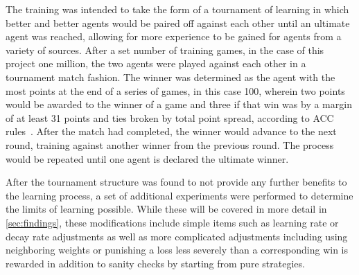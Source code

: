 The training was intended to take the form of a tournament of learning in which
better and better agents would be paired off against each other until an
ultimate agent was reached,
allowing for more experience to be gained for agents from a variety of sources.
%
After a set number of training games,
in the case of this project one million,
the two agents were played against each other in a tournament match fashion.
%
The winner was determined as the agent with the most points at the end
of a series of games, %
in this case 100, %
wherein two points would be awarded to the winner of a game and three if that
win was by a margin of at least 31 points
and ties broken by total point spread,
according to ACC rules~\cite{ACC_rules}.
%
After the match had completed,
the winner would advance to the next round,
training against another winner from the previous round.
%
The process would be
repeated until one agent is declared the ultimate winner.

After the tournament structure was found to not provide any further benefits
to the learning process,
a set of additional experiments were performed to determine the limits of
learning possible.
%
While these will be covered in more detail in \ref{sec:findings},
these modifications include simple items such as learning rate or decay rate 
adjustments
as well as
more complicated adjustments
including using neighboring weights
or punishing a loss less severely than a corresponding win is rewarded
in addition to sanity checks by starting from pure strategies.

